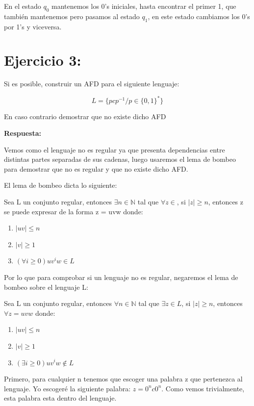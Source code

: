 \documentclass[12pt, spanish]{article}
\begin{document}
En el estado $q_0$ mantenemos los 0's iniciales, hasta encontrar el primer 1, que también mantenemos pero pasamos al estado $q_1$, en este estado cambiamos los 0's por 1's y viceversa.




\section{Ejercicio 3:}

Si es posible, construir un AFD para el siguiente lenguaje:

$$ L = \{ pcp^{-1} / p \in \{0, 1\}^* \} $$

En caso contrario demostrar que no existe dicho AFD

\textbf{Respuesta:}

Vemos como el lenguaje no es regular ya que presenta dependencias entre distintas partes separadas de sus cadenas, luego usaremos el lema de bombeo para demostrar que no es regular y que no existe dicho AFD.

El lema de bombeo dicta lo siguiente:

Sea L un conjunto regular, entonces $\exists n \in \mathbb{N}$ tal que $\forall z \in $, si $|z| \geq n$, entonces z se puede expresar de la forma z = uvw donde:

\begin{enumerate}
	\item $|uv| \leq n$
	\item $|v| \geq 1$
	\item $(\forall i \geq 0) uv^iw \in L$
\end{enumerate} 


Por lo que para comprobar si un lenguaje no es regular, negaremos el lema de bombeo sobre el lenguaje L:

Sea L un conjunto regular, entonces $\forall n \in \mathbb{N}$ tal que $\exists z \in L$, si $|z| \geq n$, entonces $\forall z = uvw$ donde:


\begin{enumerate}
	\item $|uv| \leq n$
	\item $|v| \geq 1$
	\item $(\exists i \geq 0) uv^iw \not \in L$
\end{enumerate}



Primero, para cualquier n tenemos que escoger una palabra z que pertenezca al lenguaje. Yo escogeré la siguiente palabra: $z = 0^nc0^n$. Como vemos trivialmente, esta palabra esta dentro del lenguaje.
\end{document}
